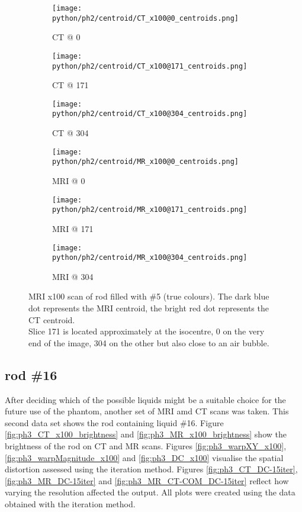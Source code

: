 \begin{figure}[!tbp]
  \begin{subfigure}[b]{0.32\textwidth}
    \texttt{[image: python/ph2/centroid/CT\_x100@0\_centroids.png]}
    \caption{CT @ 0}
    \label{fig:CT_x100_centroids@0}
  \end{subfigure}
  \begin{subfigure}[b]{0.32\textwidth}
    \texttt{[image: python/ph2/centroid/CT\_x100@171\_centroids.png]}
    \caption{CT @ 171}
    \label{fig:CT_x100_centroids@171}
  \end{subfigure}
  \begin{subfigure}[b]{0.32\textwidth}
    \texttt{[image: python/ph2/centroid/CT\_x100@304\_centroids.png]}
    \caption{CT @ 304}
    \label{fig:CT_x100_centroids@304}
  \end{subfigure}
  \begin{subfigure}[b]{0.32\textwidth}
    \texttt{[image: python/ph2/centroid/MR\_x100@0\_centroids.png]}
    \caption{MRI @ 0}
    \label{fig:MR_x100_centroids@0}
  \end{subfigure}
  \begin{subfigure}[b]{0.32\textwidth}
    \texttt{[image: python/ph2/centroid/MR\_x100@171\_centroids.png]}
    \caption{MRI @ 171}
    \label{fig:MR_x100_centroids@171}
  \end{subfigure}
  \begin{subfigure}[b]{0.32\textwidth}
    \texttt{[image: python/ph2/centroid/MR\_x100@304\_centroids.png]}
    \caption{MRI @ 304}
    \label{fig:MR_x100_centroids@304}
  \end{subfigure}
  \caption{MRI x100 scan of rod filled with \#5 (true colours). The dark blue dot represents the MRI centroid, the bright red dot represents the CT centroid.
  			\\ Slice 171 is located approximately at the isocentre, 0 on the very end of the image, 304 on the other but also close to an air bubble.}
  \label{fig:MR_x100_centroids}
\end{figure}

\clearpage

\subsection{rod \#16}

After deciding which of the possible liquids might be a suitable choice for the future use of the phantom, another set of MRI amd CT scans was taken.
This second data set shows the rod containing liquid \#16.
Figure \ref{fig:ph3_CT_x100_brightness} and \ref{fig:ph3_MR_x100_brightness} show the brightness of the rod on CT and MR scans.
Figures \ref{fig:ph3_warpXY_x100}, \ref{fig:ph3_warpMagnitude_x100} and \ref{fig:ph3_DC_x100} visualise the spatial distortion assessed using the iteration method.
Figures \ref{fig:ph3_CT_DC-15iter},  \ref{fig:ph3_MR_DC-15iter} and \ref{fig:ph3_MR_CT-COM_DC-15iter} reflect how varying the resolution affected the output.
All plots were created using the data obtained with the iteration method.

